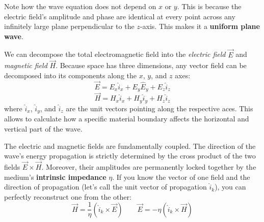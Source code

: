 Note how the wave equation does not depend on $x$ or $y$. This is because the electric field's amplitude and phase are identical at every point across any infinitely large plane perpendicular to the $z$-axis. This makes it a \textbf{uniform plane wave}.

We can decompose the total electromagnetic field into the \textit{electric field} $\vec E$ and \textit{magnetic field} $\vec H$. Because space has three dimensions, any vector field can be decomposed into its components along the $x$, $y$, and $z$ axes:
$$
\vec E = E_x \hat i_x + E_y \hat E_y + E_z \hat i_z
$$
$$
\vec H = H_x \hat i_x + H_y \hat i_y + H_z \hat i_z
$$
where $\hat i_x$, $\hat i_y$, and $\hat i_z$ are the unit vectors pointing along the respective aces. This allows to calculate how a specific material boundary affects the horizontal and vertical part of the wave.

The electric and magnetic fields are fundamentally coupled. The direction of the wave's energy propagation is strictly determined by the cross product of the two fields $\vec E \times \vec H$. Moreover, their amplitudes are permanently locked together by the medium's \textbf{intrinsic impedance} $\eta$. If you know the vector of one field and the direction of propagation (let's call the unit vector of propagation $\hat i_k$), you can perfectly reconstruct one from the other:
$$
\vec H = \frac 1 \eta \left(\hat i_k \times \vec E \right)
\qquad
\vec E = - \eta \left(\hat i_k \times \vec H \right)
$$

